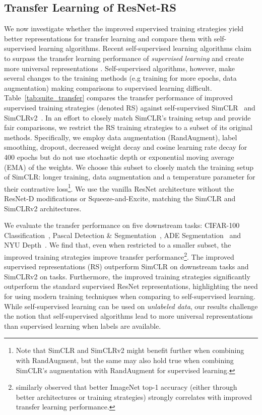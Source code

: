 \documentclass{article}
\begin{document}
\subsection{Transfer Learning of ResNet-RS}
We now investigate whether the improved supervised training strategies yield better representations for transfer learning and compare them with self-supervised learning algorithms.
Recent self-supervised learning algorithms claim to surpass the transfer learning performance of \emph{supervised learning} and create more universal representations \cite{chen2020simple,chen2020big}.
Self-supervised algorithms, however, make several changes to the training methods (e.g training for more epochs, data augmentation) making comparisons to supervised learning difficult.
Table~\ref{tab:suite_transfer} compares the transfer performance of improved supervised training strategies (denoted RS) against self-supervised SimCLR~\cite{chen2020simple} and SimCLRv2~\cite{chen2020big}.
In an effort to closely match SimCLR's training setup and provide fair comparisons, we restrict the RS training strategies to a subset of its original methods.
Specifically, we employ data augmentation (RandAugment), label smoothing, dropout, decreased weight decay and cosine learning rate decay for 400 epochs but do not use stochastic depth or exponential moving average (EMA) of the weights.
We choose this subset to closely match the training setup of SimCLR: longer training, data augmentation and a temperature parameter for their contrastive loss\footnote{Note that SimCLR and SimCLRv2 might benefit further when combining with RandAugment, but the same may also hold true when combining SimCLR's augmentation with RandAugment for supervised learning.}.
We use the vanilla ResNet architecture without the ResNet-D modifications or Squeeze-and-Excite, matching the SimCLR and SimCLRv2 architectures.

We evaluate the transfer performance on five downstream tasks: CIFAR-100 Classification~\cite{krizhevsky2009learning}, Pascal Detection \& Segmentation~\cite{everingham2010pascal}, ADE Segmentation~\cite{zhou2017scene} and NYU Depth~\cite{silberman2012indoor}.
We find that, even when restricted to a smaller subset, the improved training strategies improve transfer performance\footnote{\citet{kornblith2019better} similarly observed that better ImageNet top-1 accuracy (either through better architectures or training strategies) strongly correlates with improved transfer learning performance.}. 
The improved supervised representations (RS) outperform SimCLR on \textbf{} downstream tasks and SimCLRv2 on \textbf{} tasks. 
Furthermore, the improved training strategies significantly outperform the standard supervised ResNet representations, highlighting the need for using modern training techniques when comparing to self-supervised learning.
While self-supervised learning can be used on \emph{unlabeled data}, our results challenge the notion that self-supervised algorithms lead to more universal representations than supervised learning when labels are available.
\end{document}
